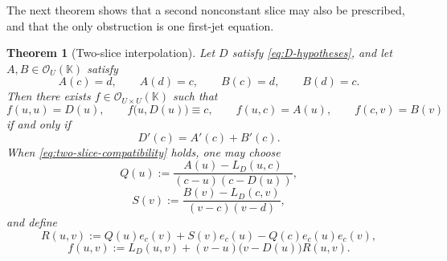 \documentclass[11pt]{amsart}
\numberwithin{equation}{section}
\newtheorem{theorem}{Theorem}[section]
\theoremstyle{remark}
\theoremstyle{definition}
\newcommand{\K}{\mathbb{K}}
\newcommand{\Oc}{\mathcal{O}}
\begin{document}
The next theorem shows that a second nonconstant slice may also be prescribed, and that the only obstruction is one first-jet equation.

\begin{theorem}[Two-slice interpolation]\label{thm:two-slice}
Let $D$ satisfy \eqref{eq:D-hypotheses}, and let $A,B\in \Oc_U(\K)$ satisfy
\[
A(c)=d,\qquad A(d)=c,\qquad B(c)=d,\qquad B(d)=c.
\]
Then there exists $f\in \Oc_{U\times U}(\K)$ such that
\begin{equation}\label{eq:two-slice-target}
f(u,u)=D(u),\qquad f\bigl(u,D(u)\bigr)\equiv c,
\qquad f(u,c)=A(u),\qquad f(c,v)=B(v)
\end{equation}
if and only if
\begin{equation}\label{eq:two-slice-compatibility}
D'(c)=A'(c)+B'(c).
\end{equation}
When \eqref{eq:two-slice-compatibility} holds, one may choose
\begin{equation}\label{eq:Q-two-slice}
Q(u):=\frac{A(u)-L_D(u,c)}{(c-u)(c-D(u))},
\end{equation}
\begin{equation}\label{eq:S-two-slice}
S(v):=\frac{B(v)-L_D(c,v)}{(v-c)(v-d)},
\end{equation}
and define
\begin{equation}\label{eq:R-two-slice}
R(u,v):=Q(u)e_c(v)+S(v)e_c(u)-Q(c)e_c(u)e_c(v),
\end{equation}
\begin{equation}\label{eq:f-two-slice}
f(u,v):=L_D(u,v)+(v-u)\bigl(v-D(u)\bigr)R(u,v).
\end{equation}
\end{theorem}
\end{document}
